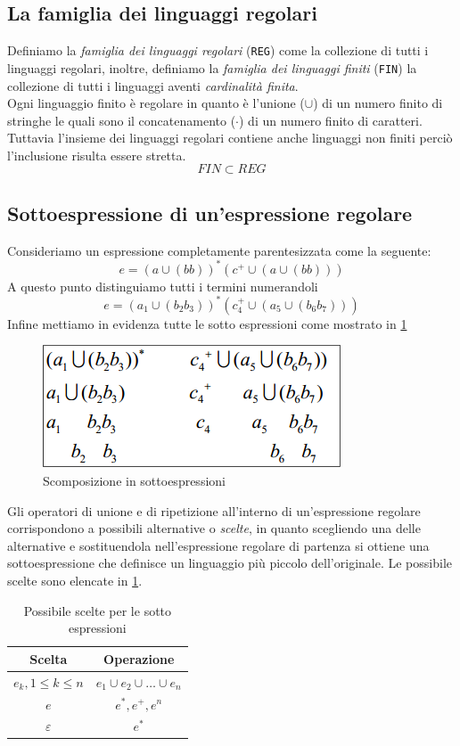 \subsection{La famiglia dei linguaggi regolari}
Definiamo la \emph{famiglia dei linguaggi regolari} (\texttt{REG}) come la collezione di tutti i linguaggi regolari, inoltre, definiamo la \emph{famiglia dei linguaggi finiti} (\texttt{FIN}) la collezione di tutti i linguaggi aventi \emph{cardinalità finita}.\\
Ogni linguaggio finito è regolare in quanto è l'unione ($ \cup $) di un numero finito di stringhe le quali sono il concatenamento ($ \cdot $) di un numero finito di caratteri. Tuttavia l'insieme dei linguaggi regolari contiene anche linguaggi non finiti perciò l'inclusione risulta essere stretta.
$$FIN\subset REG$$
\subsection{Sottoespressione di un'espressione regolare}
Consideriamo un espressione completamente parentesizzata come la seguente:
$$e = (a \cup (bb))^\ast(c^+\cup(a \cup (bb)))$$
A questo punto distinguiamo tutti i termini numerandoli
$$e = (a_1 \cup (b_2b_3))^\ast(c_4^+\cup(a_5 \cup (b_6b_7)))$$
Infine mettiamo in evidenza tutte le sotto espressioni come mostrato in \figurename\ref{fig:scompo}
\begin{figure}
	\centering
	\includegraphics[width=0.5\linewidth]{img/scompo.png}
	\caption{Scomposizione in sottoespressioni}\label{fig:scompo}
\end{figure}
Gli operatori di unione e di ripetizione all'interno di un'espressione regolare corrispondono a possibili alternative o \emph{scelte}, in quanto scegliendo una delle alternative e sostituendola nell'espressione regolare di partenza si ottiene una sottoespressione che definisce un linguaggio più piccolo dell'originale. Le possibile scelte sono elencate in \tablename \ref{tab:scelte}.
\begin{table}
	\centering
	\begin{tabular}{|c|c|}
		\hline
		\textbf{Scelta} & \textbf{Operazione} \\
		\hline
		$ e_k, 1\leq k \leq n $ & $ e_1 \cup e_2 \cup \dots \cup e_n $\\
		\hline
		$ e $ & $ e^*,e^+,e^n $\\
		\hline
		$ \varepsilon $ & $ e^\ast $ \\
		\hline
	\end{tabular}
	\caption{Possibile scelte per le sotto espressioni}\label{tab:scelte}
\end{table}
